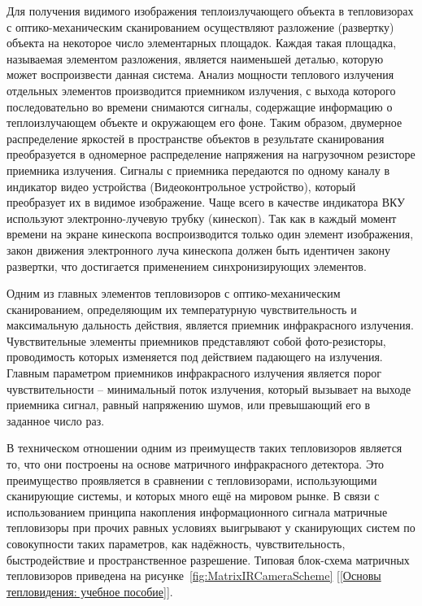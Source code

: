 \documentclass[14pt, a4paper]{extreport}
\begin{document}
	Для получения видимого изображения теплоизлучающего объекта в тепловизорах с оптико-механическим сканированием осуществляют разложение (развертку) объекта на некоторое число элементарных площадок. Каждая такая площадка, называемая элементом разложения, является наименьшей деталью, которую может воспроизвести данная система. Анализ мощности теплового излучения отдельных элементов производится приемником излучения, с выхода которого последовательно во времени снимаются сигналы, содержащие информацию о теплоизлучающем объекте и окружающем его фоне. Таким образом, двумерное распределение яркостей в пространстве объектов в результате сканирования преобразуется в одномерное распределение напряжения на нагрузочном резисторе приемника излучения. Сигналы с приемника передаются по одному каналу в индикатор видео устройства (Видеоконтрольное устройство), который преобразует их в видимое изображение. Чаще всего в качестве индикатора ВКУ используют электронно-лучевую трубку (кинескоп). Так как в каждый момент времени на экране кинескопа воспроизводится только один элемент изображения, закон движения электронного луча кинескопа должен быть идентичен закону развертки, что достигается применением синхронизирующих элементов.
	
	Одним из главных элементов тепловизоров с оптико-механическим сканированием, определяющим их температурную чувствительность и максимальную дальность действия, является приемник инфракрасного излучения. Чувствительные элементы приемников представляют собой фото-резисторы, проводимость которых изменяется под действием падающего на излучения. Главным параметром приемников инфракрасного излучения является порог чувствительности -- минимальный поток излучения, который вызывает на выходе приемника сигнал, равный напряжению шумов, или превышающий его в заданное число раз.
	
	В техническом отношении одним из преимуществ таких тепловизоров является то, что они построены на основе матричного инфракрасного детектора. Это преимущество проявляется в сравнении с тепловизорами, использующими сканирующие системы, и которых много ещё на мировом рынке. В связи с использованием принципа накопления информационного сигнала матричные тепловизоры при прочих равных условиях выигрывают у сканирующих систем по совокупности таких параметров, как надёжность, чувствительность, быстродействие и пространственное разрешение. Типовая блок-схема матричных тепловизоров приведена на рисунке~\ref{fig:MatrixIRCameraScheme} [\ref{Основы тепловидения: учебное пособие}].
	
\end{document}
